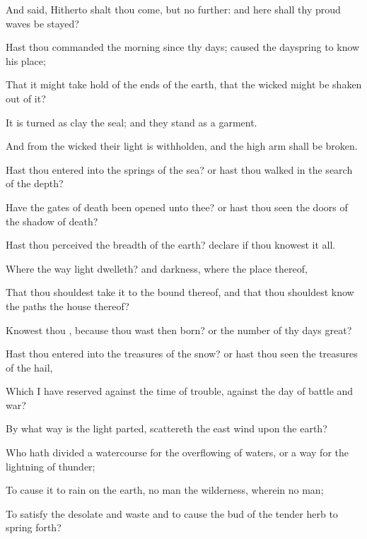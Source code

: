 {And
said,
Hitherto shalt thou
come, but no
further: and here shall thy
proud
waves be
stayed?


\par }{\PP {}Hast thou
commanded the
morning since thy
days;
{} caused the
dayspring to
know his
place;

That it might take
hold of the
ends of the
earth, that the
wicked might be shaken
out of it?

It is
turned as
clay
{} the
seal; and they
stand as a
garment.

And from the
wicked their
light is
withholden, and the
high
arm shall be
broken.

Hast thou
entered into the
springs of the
sea? or hast thou
walked in the
search of the
depth?

Have the
gates of
death been
opened unto thee? or hast thou
seen the
doors of the shadow of
death?

Hast thou
perceived the
breadth of the
earth?
declare if thou
knowest it all.

Where
{} the
way
{}
light
dwelleth? and
{}
darkness, where
{} the
place thereof,

That thou shouldest
take it to the
bound thereof, and that thou shouldest
know the
paths
{} the
house thereof?

Knowest thou
{}, because thou wast then
born? or
{} the
number of thy
days
{}
great?

Hast thou
entered into the
treasures of the
snow? or hast thou
seen the
treasures of the
hail,

Which I have
reserved against the
time of
trouble, against the
day of
battle and
war?

By
what
way is the
light
parted,
{}
scattereth the east
wind upon the
earth?


\par }{\PP {}Who hath
divided a
watercourse for the overflowing of
waters, or a
way for the
lightning of
thunder;

To cause it to
rain on the
earth,
{} no
man
{} the
wilderness, wherein
{} no
man;

To
satisfy the
desolate and
waste
{} and to cause the
bud of the tender
herb to spring
forth?

}
